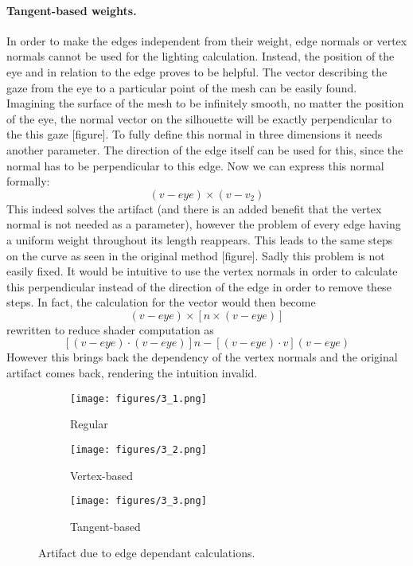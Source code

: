 \documentclass[a4paper, 12pt]{article}
\begin{document}
\paragraph{Tangent-based weights.}
In order to make the edges independent from their weight, edge normals or vertex normals cannot be used for the lighting calculation. Instead, the position of the eye and in relation to the edge proves to be helpful. The vector describing the gaze from the eye to a particular point of the mesh can be easily found. Imagining the surface of the mesh to be infinitely smooth, no matter the position of the eye, the normal vector on the silhouette will be exactly perpendicular to the this gaze [figure]. To fully define this normal in three dimensions it needs another parameter. The direction of the edge itself can be used for this, since the normal has to be perpendicular to this edge. Now we can express this normal formally:
$$(v-eye) \times (v-v_2)$$
This indeed solves the artifact (and there is an added benefit that the vertex normal is not needed as a parameter), however the problem of every edge having a uniform weight throughout its length reappears.  This leads to the same steps on the curve as seen in the original method [figure]. Sadly this problem is not easily fixed. It would be intuitive to use the vertex normals in order to calculate this perpendicular instead of the direction of the edge in order to remove these steps. In fact, the calculation for the vector would then become
$$(v-eye) \times [n \times (v-eye)]$$
rewritten to reduce shader computation as
$$[(v-eye) \cdot (v-eye)]n - [(v-eye) \cdot v](v-eye)$$
However this brings back the dependency of the vertex normals and the original artifact comes back, rendering the intuition invalid.

\begin{figure}
  \centering
  \begin{subfigure}{0.3\columnwidth}
    \texttt{[image: figures/3\_1.png]}
    \caption{Regular}
  \end{subfigure}
  \begin{subfigure}{0.3\columnwidth}
    \texttt{[image: figures/3\_2.png]}
    \caption{Vertex-based}
  \end{subfigure}
  \begin{subfigure}{0.3\columnwidth}
    \texttt{[image: figures/3\_3.png]}
    \caption{Tangent-based}
  \end{subfigure}
  \caption{Artifact due to edge dependant calculations.}
\end{figure}
\end{document}
